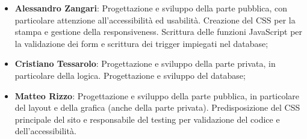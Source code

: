 \documentclass[12pt]{article}
\begin{document}
	\begin{itemize}
		\item \textbf{Alessandro Zangari}: Progettazione e sviluppo della parte pubblica, con particolare attenzione all'accessibilità ed usabilità. Creazione del CSS per la stampa e gestione della responsiveness. Scrittura delle funzioni JavaScript per la validazione dei form e scrittura dei trigger impiegati nel database;
		\item \textbf{Cristiano Tessarolo}: Progettazione e sviluppo della parte privata, in particolare della logica. Progettazione e sviluppo del database;
		\item \textbf{Matteo Rizzo}: Progettazione e sviluppo della parte pubblica, in particolare del layout e della grafica (anche della parte privata). Predisposizione del CSS principale del sito e responsabile del testing per validazione del codice e dell'accessibilità.
	\end{itemize}
	
\end{document}
